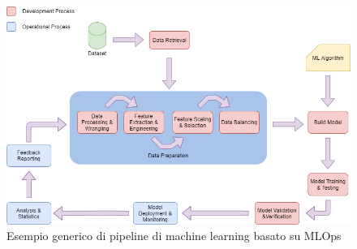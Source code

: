 \begin{figure}[h]
        \centering
        \includegraphics[width=1\textwidth]{figure/Ml Pipeline.png}
        \caption{Esempio generico di pipeline di machine learning basato su MLOps}
\end{figure}
\newpage